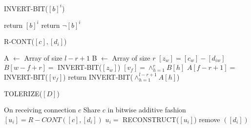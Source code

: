 \documentclass[12pt]{article}
\begin{document}
\begin{algorithm}[H]
\caption{INVERT-BIT($[b]^i$)}
\begin{algorithmic}[1]
\State return $[b]^i$
\Else
\State return $\neg [b]^i$
\EndIf
\end{algorithmic}
\end{algorithm}

\begin{algorithm}[H]
\caption{R-CONT($[c], [d_i]$)}
\begin{algorithmic}[1]
\State A $\gets$ Array of size $l-r+1$
\State B $\gets$ Array of size $r$
\State $[z_w] = [c_w]-[d_{iw}]$
\State $B[w-f+r] = $ INVERT-BIT($[z_w]$)
\EndFor
\State $[v_f] = \wedge_{h=1}^r B[h]$
\State $A[f-r+1] = $ INVERT-BIT($[v_f]$)
\EndFor
\State return  INVERT-BIT($\wedge_{h=1}^{l-r+1} A[h]$)
\end{algorithmic}
\end{algorithm}

\begin{algorithm}[H]
\caption{TOLERIZE($[D]$)}
\begin{algorithmic}[1]
\State On receiving connection $c$
\State \hspace{\algorithmicindent} Share $c$ in bitwise additive fashion 
\State $[u_i] = R-CONT([c],[d_i])$
\State $u_i = $ RECONSTRUCT($[u_i]$)
\State remove $([d_i])$
\EndIf
\EndFor
\end{algorithmic}
\end{algorithm}
\end{document}
